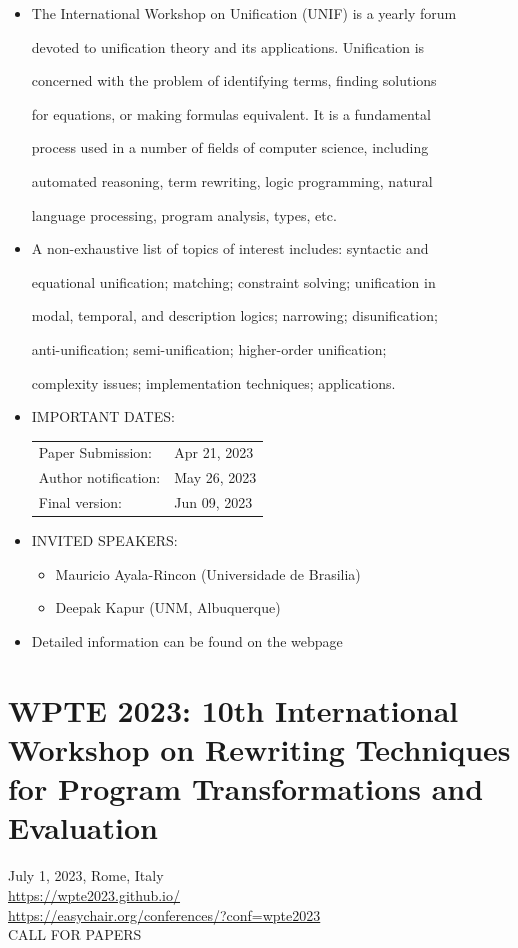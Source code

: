 \documentclass[prodmode,acmtecs]{acmsmall} %
\begin{document}
\begin{itemize}\item  The International Workshop on Unification (UNIF) is a yearly forum 
 
  devoted to unification theory and its applications. Unification is 
 
  concerned with the problem of identifying terms, finding solutions 
 
  for equations, or making formulas equivalent. It is a fundamental 
 
  process used in a number of fields of computer science, including 
 
  automated reasoning, term rewriting, logic programming, natural 
 
  language processing, program analysis, types, etc. 
 
\item  A non-exhaustive list of topics of interest includes: syntactic and 
 
  equational unification; matching; constraint solving; unification in 
 
  modal, temporal, and description logics; narrowing; disunification; 
 
  anti-unification; semi-unification; higher-order unification; 
 
  complexity issues; implementation techniques; applications. 
 
\item  IMPORTANT DATES: 
 
\begin{tabulary}{\linewidth}{LL}Paper Submission:  & Apr 21, 2023 \\
Author notification:  & May 26, 2023 \\
Final version:  & Jun 09, 2023 \\
\end{tabulary}
 
\item  INVITED SPEAKERS:  
 
\begin{itemize}\item  Mauricio Ayala-Rincon (Universidade de Brasilia)
\item  Deepak Kapur (UNM, Albuquerque)
\end{itemize} 
\item  Detailed information can be found on the webpage 
 
\end{itemize}\section{WPTE 2023: 10th International Workshop on Rewriting Techniques for Program Transformations and Evaluation}\label{WPTE2023}  July 1, 2023, Rome, Italy\\ 
  \href{https://wpte2023.github.io/}{https://wpte2023.github.io/}\\ 
  \href{https://easychair.org/conferences/?conf=wpte2023}{https://easychair.org/conferences/?conf=wpte2023}\\ 
CALL FOR PAPERS 
\end{document}
